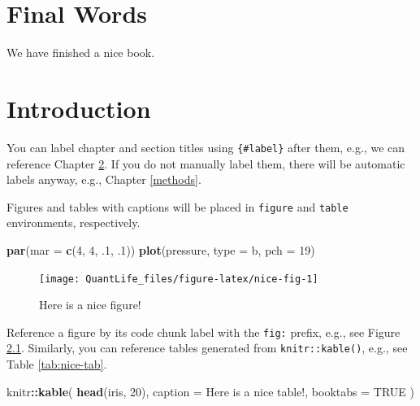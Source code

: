 \documentclass[
]{book}
\newenvironment{Shaded}{\begin{snugshade}}{\end{snugshade}}
\newcommand{\DataTypeTok}[1]{\textcolor[rgb]{0.13,0.29,0.53}{#1}}
\newcommand{\DecValTok}[1]{\textcolor[rgb]{0.00,0.00,0.81}{#1}}
\newcommand{\FloatTok}[1]{\textcolor[rgb]{0.00,0.00,0.81}{#1}}
\newcommand{\KeywordTok}[1]{\textcolor[rgb]{0.13,0.29,0.53}{\textbf{#1}}}
\newcommand{\NormalTok}[1]{#1}
\newcommand{\OperatorTok}[1]{\textcolor[rgb]{0.81,0.36,0.00}{\textbf{#1}}}
\newcommand{\OtherTok}[1]{\textcolor[rgb]{0.56,0.35,0.01}{#1}}
\newcommand{\StringTok}[1]{\textcolor[rgb]{0.31,0.60,0.02}{#1}}
\begin{document}
\hypertarget{final-words}{%
\chapter{Final Words}\label{final-words}}

We have finished a nice book.

\hypertarget{intro}{%
\chapter{Introduction}\label{intro}}

You can label chapter and section titles using \texttt{\{\#label\}} after them, e.g., we can reference Chapter \ref{intro}. If you do not manually label them, there will be automatic labels anyway, e.g., Chapter \ref{methods}.

Figures and tables with captions will be placed in \texttt{figure} and \texttt{table} environments, respectively.

\begin{Shaded}
\begin{Highlighting}[]
\KeywordTok{par}\NormalTok{(}\DataTypeTok{mar =} \KeywordTok{c}\NormalTok{(}\DecValTok{4}\NormalTok{, }\DecValTok{4}\NormalTok{, }\FloatTok{.1}\NormalTok{, }\FloatTok{.1}\NormalTok{))}
\KeywordTok{plot}\NormalTok{(pressure, }\DataTypeTok{type =} \StringTok{\textquotesingle{}b\textquotesingle{}}\NormalTok{, }\DataTypeTok{pch =} \DecValTok{19}\NormalTok{)}
\end{Highlighting}
\end{Shaded}

\begin{figure}

{\centering \texttt{[image: QuantLife\_files/figure-latex/nice-fig-1]} 

}

\caption{Here is a nice figure!}\label{fig:nice-fig}
\end{figure}

Reference a figure by its code chunk label with the \texttt{fig:} prefix, e.g., see Figure \ref{fig:nice-fig}. Similarly, you can reference tables generated from \texttt{knitr::kable()}, e.g., see Table \ref{tab:nice-tab}.

\begin{Shaded}
\begin{Highlighting}[]
\NormalTok{knitr}\OperatorTok{::}\KeywordTok{kable}\NormalTok{(}
  \KeywordTok{head}\NormalTok{(iris, }\DecValTok{20}\NormalTok{), }\DataTypeTok{caption =} \StringTok{\textquotesingle{}Here is a nice table!\textquotesingle{}}\NormalTok{,}
  \DataTypeTok{booktabs =} \OtherTok{TRUE}
\NormalTok{)}
\end{Highlighting}
\end{Shaded}
\end{document}
